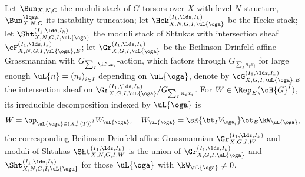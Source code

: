\documentclass[a4paper, twoside]{article}
\begin{document}
\begin{stp}
	Let $\Bun_{X,N,G}$ the moduli stack of $G$-torsors over $X$ with level $N$ structure, $\Bun_{X,N,G}^{\lqs\mu}$ its instability truncation; let $\Hck_{X,N,G,I,\uL{\oga}}^{(I_{1},\lds,I_{k})}$ be the Hecke stack; let $\Sht_{X,N,G,I,\uL{\oga}}^{(I_{1},\lds,I_{k})}$ the moduli stack of Shtukas with intersection sheaf $\cF_{X,N,G,I,\uL{\oga},E}^{(I_{1},\lds,I_{k})}$; let $\Gr_{X,G,I,\uL{\oga}}^{(I_{1},\lds,I_{k})}$ be the Beilinson-Drinfeld affine Grassmannian with $G_{\sum_{I}\ift x_{i}}$-action, which factors through $G_{\sum_{I}n_{i}x_{i}}$ for large enough $\uL{n}={(n_{i})}_{i\in I}$ depending on $\uL{\oga}$, denote by $\cG_{X,G,I,\uL{\oga},E}^{(I_{1},\lds,I_{k})}$ the intersection sheaf on $\Gr_{X,G,I,\uL{\oga}}^{(I_{1},\lds,I_{k})}/G_{\sum_{I}n_{i}x_{i}}$. For $W\in\Rep_{E}(\oH{G}^{I})$, its irreducible decomposition indexed by $\uL{\oga}$ is
		\[
			W=\op_{\uL{\oga}\in {(X_{*}^{+}(T))}^{I}}W_{\uL{\oga}},\quad W_{\uL{\oga}}=\sR{\bt_{I}V_{\oga_{i}}}\ot_{E}\kW_{\uL{\oga}},
		\]
	the corresponding Beilinson-Drinfeld affine Grassmannian $\Gr_{X,G,I,W}^{(I_{1},\lds,I_{k})}$ and moduli of Shtukas $\Sht_{X,N,G,I,W}^{(I_{1},\lds,I_{k})}$ is the union of $\Gr_{X,G,I,\uL{\oga}}^{(I_{1},\lds,I_{k})}$ and $\Sht_{X,N,G,I,\uL{\oga}}^{(I_{1},\lds,I_{k})}$ for those $\uL{\oga}$ with $\kW_{\uL{\oga}}\neq0$.
\end{stp}
\end{document}
